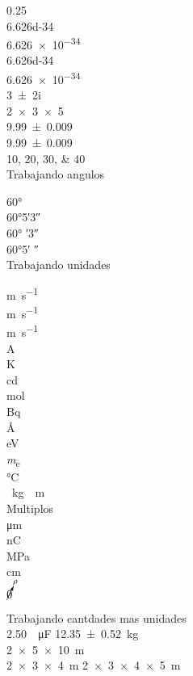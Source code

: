 \documentclass{article}
\begin{document}



\num{0.25}\\
\num{6.626d-34}\\
\num{6.626e-34}\\
\num[exponent-product=\cdot]{6.626d-34}\\
\num[exponent-base=\pi]{6.626e-34}\\
\num{3 +- 2i}\\
\num{2x3x5}\\
\num[separate-uncertainty]{9.99+-0.009}\\
\num{9.99+-0.009}\\
\numlist{10;20;30;40}\\

Trabajando angulos

\ang{60}\\
\ang{60;5;3}\\
\ang{60; ;3}\\
\ang{60;5; }\\

Trabajando unidades

\si{\meter\per\second}\\
\si{\m\per\s}\\
\si[per-mode=fraction]{\metre\per\second}\\

\si{\ampere}\\
\si{\kelvin}\\
\si{\candela}\\
\si{\mol}\\
\si{\becquerel}\\
\si{\angstrom}\\
\si{\electronvolt}\\
\si{\electronmass}\\
\si{\degreeCelsius}\\
\si{\cancel\kilogram\cancel\m}\\


Multiplos \\

\si{\micro\m}\\
\si{\nano\coulomb}\\
\si{\mega\pascal}\\
\si{\centi\m}\\
\(\cancelto{\rho}{0}\)

Trabajando cantdades mas unidades\\

\SI{2.50}{\cancel \micro\farad}
\SI{12.35+-0.52}{\kilogram}\\
\SI{2x5x10}{\m} \\
\SI[product-units = brackets-power]{2 x 3 x 4}{\metre}
\SI[product-units = repeat]{2 x 3 x 4x5}{\metre}
\end{document}
